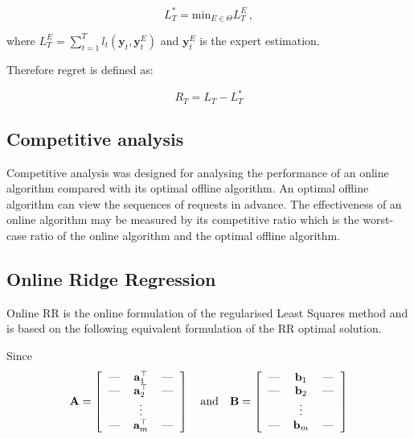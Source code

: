 \begin{equation*}
L^*_T= \text{min}_{E \in \Theta} L_T^E \, ,
\end{equation*}


\noindent where $L_T^E = \sum_{t=1}^T
l_t(\mathbf{y}_t,\mathbf{y}^E_t)$ and $\mathbf{y}^E_t$ is the expert estimation. 

Therefore regret is defined as:

\begin{equation*}
R_T = L_T - L^*_T
\end{equation*}


\subsection{Competitive analysis}

Competitive analysis was designed for analysing the performance of an online algorithm compared with its optimal offline algorithm. An optimal offline algorithm can view the sequences of requests in advance. The effectiveness of an online algorithm \cite{sleator1985} may be measured by its competitive ratio which is the worst-case ratio of the online algorithm and the optimal offline algorithm.



\subsection{Online Ridge Regression}

Online RR is the online formulation of the regularised Least Squares method
and is based on the following equivalent formulation of the RR optimal solution.

Since 
\begin{equation}
\label{eq:notation}
	\mathbf{A} = 
\left[
  \begin{tabular}{c>{$}c<{$}c}
    --- & \mathbf{a}^{\top}_{1} & ---\\
    --- & \mathbf{a}^{\top}_{2} & ---\\
    & \vdots & \\
    --- & \mathbf{a}^{\top}_{m} & ---
  \end{tabular}
\right]
\quad \text{and} \quad
\mathbf{B} =
\left[
  \begin{tabular}{c>{$}c<{$}c}
    --- & \mathbf{b}_{1} & ---\\
    --- & \mathbf{b}_{2} & ---\\
    & \vdots & \\
    --- & \mathbf{b}_{m} & ---
  \end{tabular}
\right]
\end{equation}

